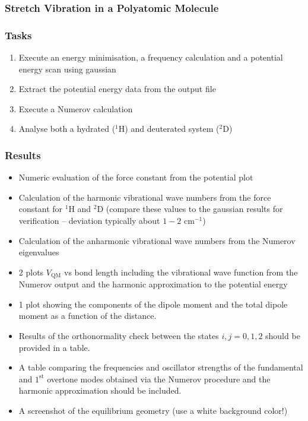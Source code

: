 \documentclass[
  letterpaper,
]{article}
\providecommand{\tightlist}{%
  \setlength{\itemsep}{0pt}\setlength{\parskip}{0pt}}\usepackage{longtable,booktabs,array}
\begin{document}
\hypertarget{stretch-vibration-in-a-polyatomic-molecule-1}{%
\subsubsection*{Stretch Vibration in a Polyatomic
Molecule}\label{stretch-vibration-in-a-polyatomic-molecule-1}}

\hypertarget{tasks-1}{%
\subsubsection*{Tasks}\label{tasks-1}}

\begin{enumerate}
\def\labelenumi{\roman{enumi})}
\tightlist
\item
  Execute an energy minimisation, a frequency calculation and a
  potential energy scan using gaussian
\item
  Extract the potential energy data from the output file
\item
  Execute a Numerov calculation
\item
  Analyse both a hydrated (\(\mathrm{^1H}\)) and deuterated system
  (\(\mathrm{^2D}\))
\end{enumerate}

\hypertarget{results-1}{%
\subsubsection*{Results}\label{results-1}}

\begin{itemize}
\tightlist
\item
  Numeric evaluation of the force constant from the potential plot
\item
  Calculation of the harmonic vibrational wave numbers from the force
  constant for \(\mathrm{^1H}\) and \(\mathrm{^2D}\) (compare these
  values to the gaussian results for verification -- deviation typically
  about \(1-2\) \(\mathrm{cm^{-1}}\))
\item
  Calculation of the anharmonic vibrational wave numbers from the
  Numerov eigenvalues
\item
  2 plots \(V_{\mathrm{QM}}\) vs bond length including the vibrational
  wave function from the Numerov output and the harmonic approximation
  to the potential energy
\item
  1 plot showing the components of the dipole moment and the total
  dipole moment as a function of the distance.
\item
  Results of the orthonormality check between the states \(i,j = 0,1,2\)
  should be provided in a table.
\item
  A table comparing the frequencies and oscillator strengths of the
  fundamental and \(1^{\mathrm{st}}\) overtone modes obtained via the
  Numerov procedure and the harmonic approximation should be included.
\item
  A screenshot of the equilibrium geometry (use a white background
  color!)
\end{itemize}
\end{document}
